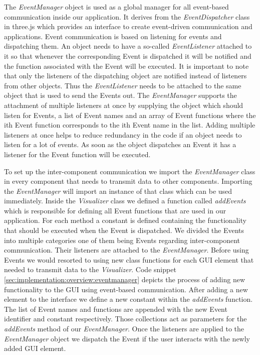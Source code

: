 The \textit{EventManager} object is used as a global manager for all event-based communication inside our application. It derives from the \textit{EventDispatcher} class in three.js which provides an interface to create event-driven communication and applications. Event communication is based on listening for events and dispatching them. An object needs to have a so-called \textit{EventListener} attached to it so that whenever the corresponding Event is dispatched it will be notified and the function associated with the Event will be executed. It is important to note that only the listeners of the dispatching object are notified instead of listeners from other objects. Thus the \textit{EventListener} needs to be attached to the same object that is used to send the Events out. The \textit{EventManager} supports the attachment of multiple listeners at once by supplying the object which should listen for Events, a list of Event names and an array of Event functions where the ith Event function corresponds to the ith Event name in the list. Adding multiple listeners at once helps to reduce redundancy in the code if an object needs to listen for a lot of events. As soon as the object dispatches an Event it has a listener for the Event function will be executed. 

To set up the inter-component communication we import the \textit{EventManager} class in every component that needs to transmit data to other components. Importing the \textit{EventManager} will import an instance of that class which can be used immediately. Inside the \textit{Visualizer} class we defined a function called \textit{addEvents} which is responsible for defining all Event functions that are used in our application. For each method a constant is defined containing the functionality that should be executed when the Event is dispatched. We divided the Events into multiple categories one of them being Events regarding inter-component communication. Their listeners are attached to the \textit{EventManager}. Before using Events we would resorted to using new class functions for each GUI element that needed to transmit data to the \textit{Visualizer}. Code snippet \ref{sec:implementation:overview:eventmanager} depicts the process of adding new functionality to the GUI using event-based communication. After adding a new element to the interface we define a new constant within the \textit{addEvents} function. The list of Event names and functions are appended with the new Event identifier and constant respectively. Those collections act as parameters for the \textit{addEvents} method of our \textit{EventManager}. Once the listeners are applied to the \textit{EventManager} object we dispatch the Event if the user interacts with the newly added GUI element. 

